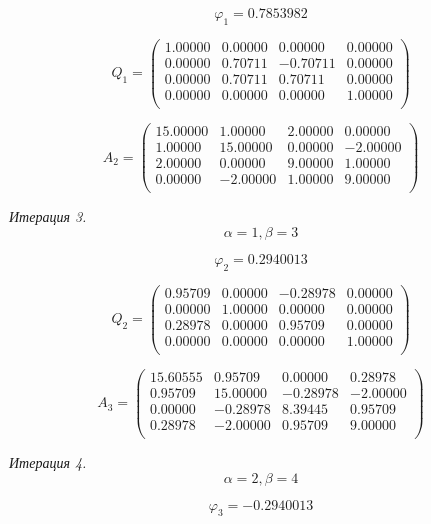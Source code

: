 \documentclass[14pt,a4paper]{scrartcl}
\begin{document}
$$\varphi_1 = 0.7853982 $$

$$ Q_1 =
\begin{pmatrix}
1.00000 & 0.00000 & 0.00000 & 0.00000 \\ 
0.00000 & 0.70711 & -0.70711 & 0.00000 \\ 
0.00000 & 0.70711 & 0.70711 & 0.00000 \\ 
0.00000 & 0.00000 & 0.00000 & 1.00000 \\ 
\end{pmatrix}
$$

$$
A_2 = 
\begin{pmatrix}
15.00000 & 1.00000 & 2.00000 & 0.00000 \\ 
1.00000 & 15.00000 & 0.00000 & -2.00000 \\ 
2.00000 & 0.00000 & 9.00000 & 1.00000 \\ 
0.00000 & -2.00000 & 1.00000 & 9.00000 \\ 
\end{pmatrix}
$$

\textit{Итерация 3.}\\
$$\alpha = 1, \beta = 3$$

$$\varphi_2 = 0.2940013 $$

$$ Q_2 =
\begin{pmatrix}
0.95709 & 0.00000 & -0.28978 & 0.00000 \\ 
0.00000 & 1.00000 & 0.00000 & 0.00000 \\ 
0.28978 & 0.00000 & 0.95709 & 0.00000 \\ 
0.00000 & 0.00000 & 0.00000 & 1.00000 \\ 
\end{pmatrix}
$$

$$
A_3 = 
\begin{pmatrix}
15.60555 & 0.95709 & 0.00000 & 0.28978 \\ 
0.95709 & 15.00000 & -0.28978 & -2.00000 \\ 
0.00000 & -0.28978 & 8.39445 & 0.95709 \\ 
0.28978 & -2.00000 & 0.95709 & 9.00000 \\ 
\end{pmatrix}
$$



\textit{Итерация 4.}\\
$$\alpha = 2, \beta = 4$$

$$\varphi_3 = -0.2940013 $$
\end{document}
